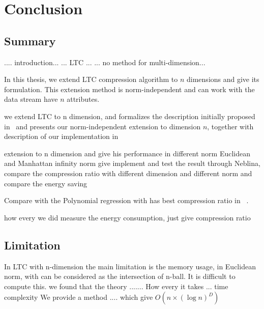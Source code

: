 \chapter{Conclusion}



\section{Summary}

.... introduction...
... LTC ...
... no method for multi-dimension...

In this thesis, we extend LTC compression algorithm to $n$ dimensions and give its formulation. This extension method is norm-independent and can work with the data stream have $n$ attributes. 


we extend LTC to n dimension, and 
formalizes the description initially proposed
in~\cite{schoellhammer2004lightweight} and presents our norm-independent
extension to dimension $n$, together with description of our implementation in

extension to n dimension and give his performance in different norm Euclidean and Manhattan  infinity norm
give implement and test the result through Neblina, compare the compression ratio with different dimension and different norm
and compare the energy saving

Compare with the Polynomial regression with has best compression ratio in ~\cite{zordan2014performance}.

how every we did measure the energy consumption, just give compression ratio




\section{Limitation}

In LTC with n-dimension the main limitation is the memory usage, in Euclidean norm, with can be considered as the intersection of n-ball.
It is difficult to compute this. we found that the theory .......
How every it takes ... time complexity
We provide a method .... which give $O(n\times (\log{n})^D)$


